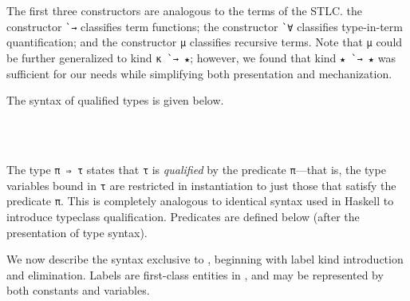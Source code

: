 \documentclass[authoryear, acmsmall, screen, review, nonacm]{acmart}
\begin{document}
The first three constructors are analogous to the terms of the STLC. the constructor \verb!`→! classifies term functions; the constructor \verb!`∀! classifies type-in-term quantification; and the constructor \verb!μ! classifies recursive terms. Note that \verb!μ! could be further generalized to kind \verb!κ `→ ★!; however, we found that kind \verb!★ `→ ★! was sufficient for our needs while simplifying both presentation and mechanization.

The syntax of qualified types is given below.

\begin{code}%
%
\>[2]\AgdaSpace{}%
\AgdaSymbol{:}\<%
\\
\>[2][@{}l@{\AgdaIndent{0}}]%
\>[4]\AgdaSymbol{(}\AgdaSpace{}%
\AgdaSymbol{:}\AgdaSpace{}%
\AgdaSpace{}%
\AgdaSpace{}%
\AgdaOperator{\AgdaInductiveConstructor{R[}}\AgdaSpace{}%
\AgdaSpace{}%
\AgdaOperator{\AgdaInductiveConstructor{]}}\AgdaSymbol{)}\AgdaSpace{}%
\AgdaSpace{}%
\AgdaSymbol{(}\AgdaSpace{}%
\AgdaSymbol{:}\AgdaSpace{}%
\AgdaSpace{}%
\AgdaSpace{}%
\AgdaSymbol{)}\AgdaSpace{}%
\<%
\\
%
\>[4]\AgdaSpace{}%
\AgdaSpace{}%
\<%
\end{code}

The type \verb!π ⇒ τ! states that \verb!τ! is \emph{qualified} by the predicate \verb!π!---that is, the type variables bound in \verb!τ! are restricted in instantiation to just those that satisfy the predicate \verb!π!. This is completely analogous to identical syntax used in Haskell to introduce typeclass qualification. Predicates are defined below (after the presentation of type syntax).

We now describe the syntax exclusive to \Rome, beginning with label kind introduction and elimination. Labels are first-class entities in \Rome, and may be represented by both constants and variables. 
\end{document}
